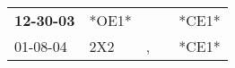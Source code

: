 \begin{supertabular}{p{0.07\textwidth}p{0.06\textwidth}p{0.02\textwidth}p{0.02\textwidth}p{0.06\textwidth}}
 \textbf{12-30-03\textsuperscript{}} &                  *OE1* &    &   &  *CE1* \\
          01-08-04\textsuperscript{} &  2X2\textsuperscript{} &  , &   &  *CE1* \\
\end{supertabular}
